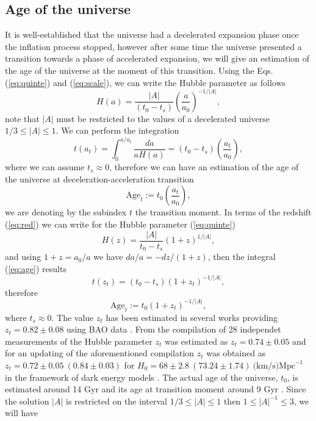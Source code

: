 \documentclass[twocolumn,showpacs,nofootinbib,floats,amsmath,amssymb]{revtex4}
\begin{document}
\subsection{Age of the universe}  
It is well-established that the universe had a decelerated expansion phase once the inflation process stopped, however after some time the universe presented a transition towards a phase of accelerated expansion, we will give an estimation of the age of the universe at the moment of this transition. Using the Eqs. (\ref{eq:quinte}) and (\ref{eq:scale}), we can write the Hubble parameter as follows
\begin{equation}
H(a) = \frac{\left|A\right|}{(t_{0}-t_{s})}\left(\frac{a}{a_{0}}\right)^{-1/\left|A\right|},
\end{equation} 
note that $\left|A\right|$ must be restricted to the values of a decelerated universe $1/3 \leq \left|A\right| \leq 1$. We can perform the integration \cite{transition}
\begin{equation}
t(a_{t}) = \int^{a/a_{t}}_{0}\frac{da}{aH(a)} = (t_{0}-t_{s})\left(\frac{a_{t}}{a_{0}}\right),
\end{equation}
where we can assume $t_{s} \approx 0$, therefore we can have an estimation of the age of the universe at deceleration-acceleration transition
\begin{equation}
\mbox{Age}_{t} := t_{0}\left(\frac{a_{t}}{a_{0}}\right),
\label{eq:age}
\end{equation} 
we are denoting by the subindex $t$ the transition moment. In terms of the redshift (\ref{eq:red}) we can write for the Hubble parameter (\ref{eq:quinte})
\begin{equation}
H(z) = \frac{\left|A\right|}{t_{0}-t_{s}}(1+z)^{1/\left|A\right|},
\end{equation} 
and using $1+z = a_{0}/a$ we have $da/a = - dz/(1+z)$, then the integral (\ref{eq:age}) results
\begin{equation}
t(z_{t}) = (t_{0}-t_{s})(1+z_{t})^{-1/\left|A\right|}, 
\end{equation} 
therefore
\begin{equation}
\mbox{Age}_{t} := t_{0}(1+z_{t})^{-1/\left|A\right|},
\end{equation}
where $t_{s} \approx 0$. The value $z_{t}$ has been estimated in several works providing $z_{t} = 0.82 \pm 0.08$ using BAO data \cite{bao}. From the compilation of 28 independet measurements of the Hubble parameter $z_{t}$ was estimated as $z_{t} = 0.74 \pm 0.05$ \cite{28} and for an updating of the aforementioned compilation $z_{t}$ was obtained as $z_{t} = 0.72 \pm 0.05 \ (0.84 \pm 0.03)$ for $H_{0}= 68 \pm 2.8 \ (73.24 \pm 1.74) \ \mbox{(km/s)Mpc}^{-1}$ in the framework of dark energy models \cite{38}. The actual age of the universe, $t_{0}$, is estimated around 14 Gyr \cite{highz, age} and its age at transition moment around 9 Gyr \cite{transition}. Since the solution $\left|A\right|$ is restricted on the interval $1/3 \leq \left|A\right| \leq 1$ then $1 \leq \left|A\right|^{-1} \leq 3$, we will have
\end{document}
